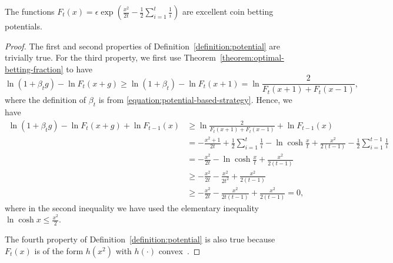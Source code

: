 \begin{theorem}
\label{thm:exp_x2}
The functions $F_t(x)=\epsilon\exp(\tfrac{x^2}{2t}- \frac{1}{2}\sum_{i=1}^t \tfrac{1}{i})$ are excellent coin betting potentials.
\end{theorem}
%
\begin{proof}
The first and second properties of Definition~\ref{definition:potential} are trivially true.
For the third property, we first use Theorem~\ref{theorem:optimal-betting-fraction} to have
\[
\ln(1+\beta_t g) - \ln F_t(x+g) \geq \ln(1+\beta_t) - \ln F_t(x+1) = \ln \frac{2}{F_t(x+1)+F_t(x-1)},
\]
where the definition of $\beta_t$ is from \eqref{equation:potential-based-strategy}.
Hence, we have
\begin{align*}
\ln(1+\beta_t g) - \ln F_t(x+g)  +\ln F_{t-1}(x) 
&\geq \ln \frac{2}{F_t(x+1)+F_t(x-1)} +\ln F_{t-1}(x) \\
&= -\frac{x^2+1}{2t} +\frac{1}{2}\sum_{i=1}^t \frac{1}{i} -\ln \cosh \frac{x}{t} + \frac{x^2}{2(t-1)} - \frac{1}{2}\sum_{i=1}^{t-1} \frac{1}{i}\\
&= -\frac{x^2}{2t} -\ln \cosh \frac{x}{t} + \frac{x^2}{2(t-1)}\\
&\geq -\frac{x^2}{2t}  -\frac{x^2}{2 t^2} + \frac{x^2}{2(t-1)} \\
&\geq -\frac{x^2}{2t}  -\frac{x^2}{2 t (t-1)} + \frac{x^2}{2(t-1)} =0,
\end{align*}
where in the second inequality we have used the elementary inequality $\ln \cosh x \leq \tfrac{x^2}{2}$.

The fourth property of Definition~\ref{definition:potential} is also true because $F_t(x)$ is of the form $h(x^2)$ with $h(\cdot)$ convex~\cite{McMahan-Orabona-2014}.
\end{proof}
